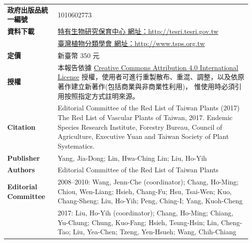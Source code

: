 \begin{table}[H]
{\begin{tabular}{>{\raggedleft\arraybackslash}p{3cm}p{10cm}}
      \textbf{政府出版品統一編號}        & 1010602773 \\
      \textbf{資料下載}          & \href{http://tesri.tesri.gov.tw}{特有生物研究保育中心 網址：http://tesri.tesri.gov.tw} \\
                                 & \href{http://www.tsps.org.tw}{臺灣植物分類學會 網址：http://www.tsps.org.tw} \\
      \textbf{定價}              & 新臺幣 350 元 \\
      \textbf{授權}              & 本報告依據
                                   \href{https://creativecommons.org/licenses/by/4.0}{Creative Commons Attribution 4.0 International License}
                                   授權，使用者可進行重製散布、重混、調整，以及依原著作建立新著作(包括商業與非商業性利用)，
                                   惟使用時必須引用按照指定方式註明來源。 \\
      \textbf{Citation}          & Editorial Committee of the Red List of Taiwan Plants (2017) The Red List of Vascular Plants of Taiwan, 2017.
                                   Endemic Species Research Institute, Forestry Bureau, Council of Agriculture, 
                                   Executive Yuan and Taiwan Society of Plant Systematics. \\
      \textbf{Publisher}         & Yang, Jia-Dong; Lin, Hwa-Ching Lin; Liu, Ho-Yih \\
      \textbf{Authors}           & Editorial Committee of the Red List of Taiwan Plants \\
      \textbf{Editorial Committee} & 2008--2010: Wang, Jenn-Che (coordinator);
                                     Chang, Ho-Ming;
                                     Chiou, Wen-Liang;
                                     Hsieh, Chang-Fu;
                                     Hsu, Tsai-Wen;
                                     Kuo, Chang-Sheng;
                                     Liu, Ho-Yih;
                                     Peng, Ching-I;
                                     Yang, Kuoh-Cheng \\
                                   &  2017: Liu, Ho-Yih (coordinator);
                                     Chang, Ho-Ming;
                                     Chiang, Yu-Chung;
                                     Chung, Kuo-Fang;
                                     Hsieh, Tsung-Hsin; 
                                     Lin, Cheng-Tao;
                                     Liu, Yea-Chen;
                                     Tzeng, Yen-Hsueh; 
                                     Wang, Chih-Chiang \\

\end{tabular}}
\end{table}
